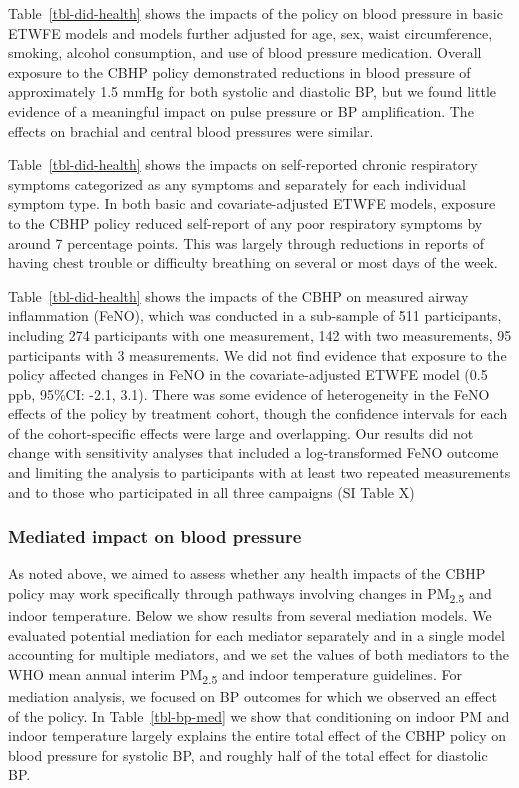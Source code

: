 \documentclass[
  letterpaper,
  DIV=11,
  numbers=noendperiod]{scrartcl}
\begin{document}
Table~\ref{tbl-did-health} shows the impacts of the policy on blood
pressure in basic ETWFE models and models further adjusted for age, sex,
waist circumference, smoking, alcohol consumption, and use of blood
pressure medication. Overall exposure to the CBHP policy demonstrated
reductions in blood pressure of approximately 1.5 mmHg for both systolic
and diastolic BP, but we found little evidence of a meaningful impact on
pulse pressure or BP amplification. The effects on brachial and central
blood pressures were similar.

Table~\ref{tbl-did-health} shows the impacts on self-reported chronic
respiratory symptoms categorized as any symptoms and separately for each
individual symptom type. In both basic and covariate-adjusted ETWFE
models, exposure to the CBHP policy reduced self-report of any poor
respiratory symptoms by around 7 percentage points. This was largely
through reductions in reports of having chest trouble or difficulty
breathing on several or most days of the week.

Table~\ref{tbl-did-health} shows the impacts of the CBHP on measured
airway inflammation (FeNO), which was conducted in a sub-sample of 511
participants, including 274 participants with one measurement, 142 with
two measurements, 95 participants with 3 measurements. We did not find
evidence that exposure to the policy affected changes in FeNO in the
covariate-adjusted ETWFE model (0.5 ppb, 95\%CI: -2.1, 3.1). There was
some evidence of heterogeneity in the FeNO effects of the policy by
treatment cohort, though the confidence intervals for each of the
cohort-specific effects were large and overlapping. Our results did not
change with sensitivity analyses that included a log-transformed FeNO
outcome and limiting the analysis to participants with at least two
repeated measurements and to those who participated in all three
campaigns (SI Table X)

\hypertarget{mediated-impact-on-blood-pressure}{%
\subsubsection{Mediated impact on blood
pressure}\label{mediated-impact-on-blood-pressure}}

As noted above, we aimed to assess whether any health impacts of the
CBHP policy may work specifically through pathways involving changes in
PM\textsubscript{2.5} and indoor temperature. Below we show results from
several mediation models. We evaluated potential mediation for each
mediator separately and in a single model accounting for multiple
mediators, and we set the values of both mediators to the WHO mean
annual interim PM\textsubscript{2.5} and indoor temperature guidelines.
For mediation analysis, we focused on BP outcomes for which we observed
an effect of the policy. In Table~\ref{tbl-bp-med} we show that
conditioning on indoor PM and indoor temperature largely explains the
entire total effect of the CBHP policy on blood pressure for systolic
BP, and roughly half of the total effect for diastolic BP.
\end{document}
